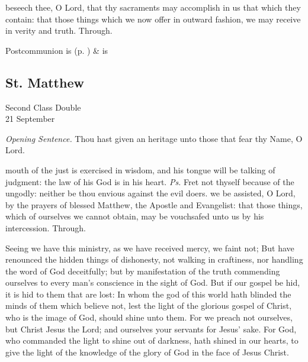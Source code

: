 \postcommunion
{} beseech thee, O Lord, that thy sacraments may accomplish in us that which they contain: that those things which we now offer in outward fashion, we may receive in verity and truth. Through.
\begin{rubric}
     Postcommunion is  (p. \pageref{SPSaints}) \&  is 
\end{rubric}


\clearpage
\subsection{St. Matthew}
\begin{inhead}
    {Second Class Double\\
21 September}
\end{inhead}
\par\noindent
\textit{Opening Sentence.} Thou hast given an heritage unto those that fear thy Name, O Lord.

\introit
{} mouth of the just is exercised in wisdom, and his tongue will be talking of judgment: the law of his God is in his heart. \textit{Ps.} Fret not thyself because of the ungodly: neither be thou envious against the evil doers.
\collect
 we be assisted, O Lord, by the prayers of blessed Matthew, the Apostle and Evangelist: that those things, which of ourselves we cannot obtain, may be vouchsafed unto us by his intercession. Through.

 Seeing we have this ministry, as we have received mercy, we faint not; But have renounced the hidden things of dishonesty, not walking in craftiness, nor handling the word of God deceitfully; but by manifestation of the truth commending ourselves to every man's conscience in the sight of God. But if our gospel be hid, it is hid to them that are lost: In whom the god of this world hath blinded the minds of them which believe not, lest the light of the glorious gospel of Christ, who is the image of God, should shine unto them. For we preach not ourselves, but Christ Jesus the Lord; and ourselves your servants for Jesus' sake. For God, who commanded the light to shine out of darkness, hath shined in our hearts, to give the light of the knowledge of the glory of God in the face of Jesus Christ.

